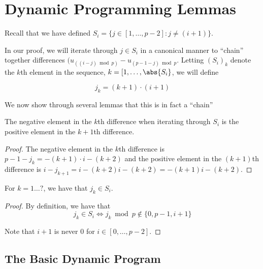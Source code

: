 \section{Dynamic Programming Lemmas}
\label{sec:dynam-progr-lemm}

Recall that we have defined $S_{i}=\{j \in [1,\ldots,p-2]: j \neq
(i+1)\}$. 

In our proof, we will iterate through $j \in S_{i}$ in a canonical
manner to ``chain'' together differences
$(u_{((i-j)\bmod{p})}-u_{(p-1-j)\bmod{p}}$. Letting $(S_{i})_{k}$
denote the $k$th element in the sequence, $k=[1,\ldots,\abs{S_{i}}$,
we will define

\begin{equation}
\label{eq:sequenceS}
j_{k}=(k+1)\cdot (i + 1)\end{equation}

We now show through several lemmas that this is in fact a ``chain''

\begin{lemma}
\label{lem:conditional-prob}
The negative element in the $k$th difference when iterating through $S_i$ is the positive
element in the $k+1$th difference.
\end{lemma}
\begin{proof}
The negative element in the $k$th difference is
$p-1-j_k=-(k+1)\cdot i - (k+2)$ and the positive element in the
$(k+1)$th difference is $i-j_{k+1}=i-(k+2)i-(k+2)=-(k+1)i-(k+2)$.
\end{proof}
\begin{lemma}
\label{lem:chain-range}
For $k=1\ldots ?$, we have that $j_{k} \in S_{i}$. 
\end{lemma}
\begin{proof}
By definition, we have that 
\[j_{k} \in S_{i} \iff j_{k} \bmod{p} \notin \{0,p-1,i+1\}\]

Note that $i+1$ is never $0$ for $i \in [0,\ldots,p-2]$. 

\end{proof}


\subsection{The Basic Dynamic Program}
\label{sec:basic-dynam-progr}


